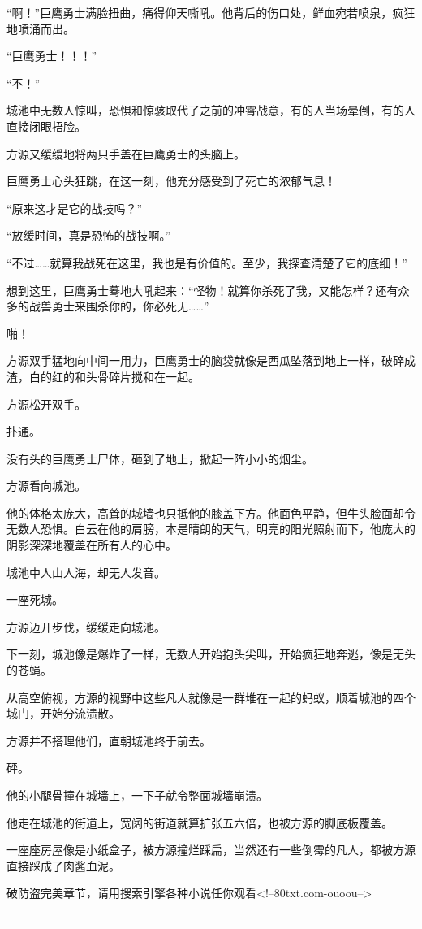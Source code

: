 \begin{this_body}
“啊！”巨鹰勇士满脸扭曲，痛得仰天嘶吼。他背后的伤口处，鲜血宛若喷泉，疯狂地喷涌而出。

“巨鹰勇士！！！”

“不！”

城池中无数人惊叫，恐惧和惊骇取代了之前的冲霄战意，有的人当场晕倒，有的人直接闭眼捂脸。

方源又缓缓地将两只手盖在巨鹰勇士的头脑上。

巨鹰勇士心头狂跳，在这一刻，他充分感受到了死亡的浓郁气息！

“原来这才是它的战技吗？”

“放缓时间，真是恐怖的战技啊。”

“不过……就算我战死在这里，我也是有价值的。至少，我探查清楚了它的底细！”

想到这里，巨鹰勇士蓦地大吼起来：“怪物！就算你杀死了我，又能怎样？还有众多的战兽勇士来围杀你的，你必死无……”

啪！

方源双手猛地向中间一用力，巨鹰勇士的脑袋就像是西瓜坠落到地上一样，破碎成渣，白的红的和头骨碎片搅和在一起。

方源松开双手。

扑通。

没有头的巨鹰勇士尸体，砸到了地上，掀起一阵小小的烟尘。

方源看向城池。

他的体格太庞大，高耸的城墙也只抵他的膝盖下方。他面色平静，但牛头脸面却令无数人恐惧。白云在他的肩膀，本是晴朗的天气，明亮的阳光照射而下，他庞大的阴影深深地覆盖在所有人的心中。

城池中人山人海，却无人发音。

一座死城。

方源迈开步伐，缓缓走向城池。

下一刻，城池像是爆炸了一样，无数人开始抱头尖叫，开始疯狂地奔逃，像是无头的苍蝇。

从高空俯视，方源的视野中这些凡人就像是一群堆在一起的蚂蚁，顺着城池的四个城门，开始分流溃散。

方源并不搭理他们，直朝城池终于前去。

砰。

他的小腿骨撞在城墙上，一下子就令整面城墙崩溃。

他走在城池的街道上，宽阔的街道就算扩张五六倍，也被方源的脚底板覆盖。

一座座房屋像是小纸盒子，被方源撞烂踩扁，当然还有一些倒霉的凡人，都被方源直接踩成了肉酱血泥。

破防盗完美章节，请用搜索引擎各种小说任你观看<!--80txt.com-ouoou-->

------------

\end{this_body}

